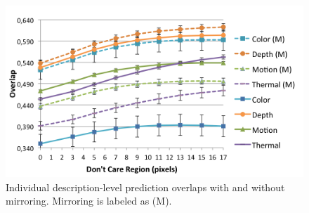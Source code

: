 \documentclass[10pt,twocolumn,letterpaper]{article}
\begin{document}
\begin{figure}[htbp]
\centering
	\includegraphics[width=1\columnwidth]{individual.png}
	\caption{Individual description-level prediction overlaps with and without mirroring. Mirroring is labeled as (M).}
	\label{fig:individual_overlap}
\end{figure}
\end{document}
